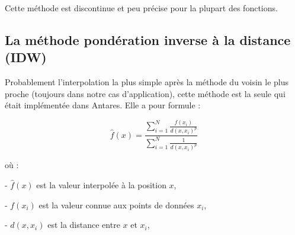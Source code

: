 \begin{center}
\end{center}

\vspace{0.5cm}

Cette méthode est discontinue et peu précise pour la plupart des fonctions.



\subsection{La méthode pondération inverse à la distance (IDW)} %

Probablement l'interpolation la plus simple après la méthode du voisin le plus proche (toujours dans notre cas d'application), cette méthode est la seule qui était implémentée dans Antares. Elle a pour formule :

\[
\hat{f}(x) = \frac{\sum_{i=1}^{N} \frac{f(x_i)}{d(x, x_i)^p}}{\sum_{i=1}^{N} \frac{1}{d(x, x_i)^p}}
\]

où :

- \(\hat{f}(x)\) est la valeur interpolée à la position \(x\),

- \(f(x_i)\) est la valeur connue aux points de données \(x_i\),

- \(d(x, x_i)\) est la distance entre \(x\) et \(x_i\),

